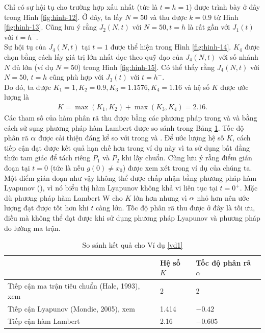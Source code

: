 \begin{vd}
Chỉ có sự hội tụ cho trường hợp xấu nhất (tức là $ t = h = 1$) được trình bày ở đây trong Hình \ref{fig:hinh-12}. Ở đây, ta lấy $N = 50$ và thu được $k = 0.9$ từ Hình \ref{fig:hinh-13}. Cũng lưu ý rằng $J_2(N,t)$ với $N = 50, t =h$ là rất gần với $J_1(t)$ với $ t = h^-$. \\
%
Sự hội tụ của $J_4(N,t)$ tại $t =1$ được thể hiện trong Hình \ref{fig:hinh-14}. $K_4$ được chọn bằng cách lấy giá trị lớn nhất dọc theo quỹ đạo của $J_4(N,t)$ với số nhánh $N$ đủ lớn (ví dụ $N = 50$) trong Hình \ref{fig:hinh-15}. Có thể thấy rằng $J_4(N,t)$ với $N = 50$, $t =h$ cũng phù 
hợp với $J_3(t)$ với $t = h^-$.\\
Do đó, ta được $K_1 =1, K_2=0.9, K_3 = 1.1576, K_4 = 1.16$ và hệ số $K$ được ước lượng là
\begin{align*}
	K = \max(K_1,K_2) + \max(K_3,K_4) = 2.16.
\end{align*}
Các tham số của hàm phân rã thu được bằng các phương pháp trong \cite{Hal93} và \cite{Mon05} và bằng cách sử sụng phương pháp hàm Lambert được so sánh trong Bảng \ref{bang 1}. Tốc độ phân rã $\alpha$ được cải thiện đáng kể so với trong \cite{Hal93} và \cite{Mon05}. Để ước lượng hệ số $K$, cách tiếp cận đạt được kết quả hạn chế hơn trong ví dụ này vì ta sử dụng bất đẳng thức tam giác để tách riêng $P_1$ và $P_2$ khi lấy chuẩn. Cũng lưu ý rằng điểm gián đoạn tại $t=0$ (tức là nếu $g(0) \ne x_0$) được xem xét trong ví dụ của chúng ta. Một điểm gián đoạn như vậy không thể được chấp nhận bằng phương pháp hàm Lyapunov (\cite{Mon05}), vì nó biểu thị hàm Lyapunov không khả vi liên tục tại $ t = 0^+$. Mặc dù phương pháp hàm Lambert W cho $K$ lớn hơn nhưng vì $\alpha$ nhỏ hơn nên ước lượng đạt được tốt hơn khi $t$ càng lớn. Tốc độ phân rã thu được ở đây là tối ưu, điều mà không thể đạt được khi sử dụng phương pháp Lyapunov và phương pháp đo lường ma trận. 

	\begin{table}[!h]
		\centering
		\begin{tabular}{lll}
			\hline 
			& Hệ số $K$ & Tốc độ phân rã $\alpha$ \\ 
			\hline 
			Tiếp cận ma trận tiêu chuẩn (Hale, 1993), xem \cite{Hal93} & 2& 2 \\			
			Tiếp cận Lyapunov (Mondie, 2005), xem \cite{Mon05} & 1.414 & $-0.42$ \\ 	
			Tiếp cận hàm Lambert & 2.16 & $-0.605$ \\		
		\hline 
		\end{tabular} 
		\caption{So sánh kết quả cho Ví dụ \ref{vd1}}
	\label{bang 1}
\end{table}
\end{vd}

